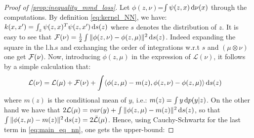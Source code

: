 \begin{proof}[Proof of \cref{prop:inequality_mmd_loss}]\label{proof:prop:inequality_mmd_loss}Let $\phi(z,\nu)$=$\int \psi(z,x)\mathop{}\!\mathrm{d} \nu(x)$ through the computations. By definition \eqref{eq:kernel_NN}, we have: $k(x,x') =\int_{z}\psi(z,x)^T\psi(z,x')\mathop{}\!\mathrm{d} s(z)$ where $s$ denotes the distribution of $z$. It is easy to see that ${{\mathcal F}}(\nu) = \frac{1}{2} \int \Vert \phi(z,\nu) -\phi(z,\mu)  \Vert^2 \mathop{}\!\mathrm{d} s(z) $. Indeed expanding the square in the l.h.s and exchanging the order of integrations w.r.t $s$ and $(\mu\otimes \nu)$ one get ${{\mathcal F}}(\nu)$.
	Now, introducing $\phi(z,\mu)$ in the expression of $\mathcal{L}(\nu)$, it follows by a simple calculation that:
\begin{align}\label{eq:main_eq_nn}
 \mathcal{L}(\nu)&= \mathcal{L}(\mu)+ \mathcal{F}(\nu)+ \int \langle \phi(z,\mu)-m(z),\phi(z,\nu)-\phi(z,\mu) \rangle\mathop{}\!\mathrm{d} s(z)
\end{align}
where $m(z)$ is the conditional mean of $y$, i.e.: $m(z)=\int y \mathop{}\!\mathrm{d} p(y|z)$. On the other hand we have that $2\mathcal{L}(\mu) = var(y) + \int \Vert \phi(z,\mu)-m(z)\Vert^2\mathop{}\!\mathrm{d} s(z)$, so that $ \int \Vert \phi(z,\mu)-m(z)\Vert^2\mathop{}\!\mathrm{d} s(z) = 2\bar{\mathcal{L}}(\mu)$. Hence, using Cauchy-Schwartz for the last term in \cref{eq:main_eq_nn}, one gets the upper-bound:

\end{proof}
